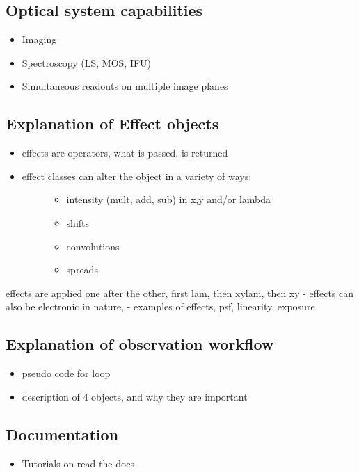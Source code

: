 

\subsection{Optical system capabilities%
  \label{optical-system-capabilities}%
}

\begin{itemize}
\item Imaging

\item Spectroscopy (LS, MOS, IFU)

\item Simultaneous readouts on multiple image planes
\end{itemize}


\subsection{Explanation of Effect objects%
  \label{explanation-of-effect-objects}%
}

\begin{itemize}
\item effects are operators, what is passed, is returned

\item 
\begin{description}
\item[{effect classes can alter the object in a variety of ways:}] \leavevmode 
\begin{itemize}
\item intensity (mult, add, sub) in x,y and/or lambda

\item shifts

\item convolutions

\item spreads
\end{itemize}

\end{description}
\end{itemize}

effects are applied one after the other, first lam, then xylam, then xy
- effects can also be electronic in nature,
- examples of effects, psf, linearity, exposure


\subsection{Explanation of observation workflow%
  \label{explanation-of-observation-workflow}%
}

\begin{itemize}
\item pseudo code for loop

\item description of 4 objects, and why they are important
\end{itemize}


\subsection{Documentation%
  \label{documentation}%
}

\begin{itemize}
\item Tutorials on read the docs
\end{itemize}
